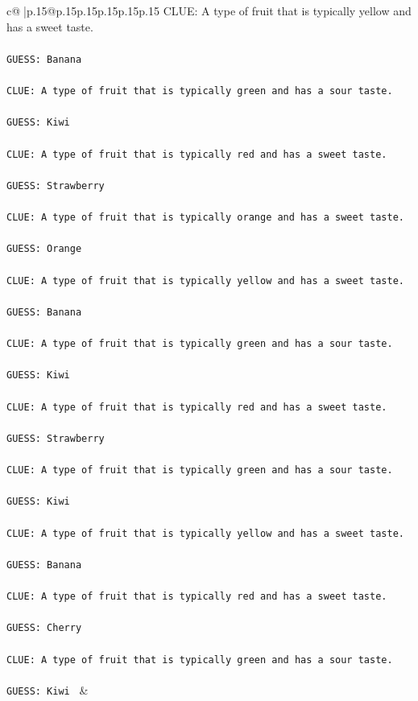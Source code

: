 \documentclass{article}
\begin{document}
{\begin{supertabular}{c@{$\;$}|p{.15\linewidth}@{}p{.15\linewidth}p{.15\linewidth}p{.15\linewidth}p{.15\linewidth}p{.15\linewidth}}
{{{	 CLUE: A type of fruit that is typically yellow and has a sweet taste.\\ \tt \\ \tt GUESS: Banana\\ \tt \\ \tt CLUE: A type of fruit that is typically green and has a sour taste.\\ \tt \\ \tt GUESS: Kiwi\\ \tt \\ \tt CLUE: A type of fruit that is typically red and has a sweet taste.\\ \tt \\ \tt GUESS: Strawberry\\ \tt \\ \tt CLUE: A type of fruit that is typically orange and has a sweet taste.\\ \tt \\ \tt GUESS: Orange\\ \tt \\ \tt CLUE: A type of fruit that is typically yellow and has a sweet taste.\\ \tt \\ \tt GUESS: Banana\\ \tt \\ \tt CLUE: A type of fruit that is typically green and has a sour taste.\\ \tt \\ \tt GUESS: Kiwi\\ \tt \\ \tt CLUE: A type of fruit that is typically red and has a sweet taste.\\ \tt \\ \tt GUESS: Strawberry\\ \tt \\ \tt CLUE: A type of fruit that is typically green and has a sour taste.\\ \tt \\ \tt GUESS: Kiwi\\ \tt \\ \tt CLUE: A type of fruit that is typically yellow and has a sweet taste.\\ \tt \\ \tt GUESS: Banana\\ \tt \\ \tt CLUE: A type of fruit that is typically red and has a sweet taste.\\ \tt \\ \tt GUESS: Cherry\\ \tt \\ \tt CLUE: A type of fruit that is typically green and has a sour taste.\\ \tt \\ \tt GUESS: Kiwi 
	  } 
	   } 
	   } 
	 & \\ 
 


\end{supertabular}}
\end{document}
